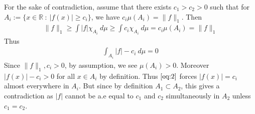\documentclass[12pt]{exam}
\theoremstyle{plain} %
\theoremstyle{definition} %
\theoremstyle{remark} %
\begin{document}
\begin{questions}
  \question
  \begin{solution}
    For the sake of contradiction, assume that there exists $c_1 >
    c_2 > 0$ such that for $A_i := \{ x \in \mathbb{R} \ :
    \ |f(x)| \ge c_i\}$,  we have $c_i\mu(A_i) = \|f\|_1$.
    Then
    \begin{align*}
      \|f\|_1 \ge \int |f|\chi_{A_i} \ d \mu \ge \int  c_i \chi_{A_i}
      \ d \mu = c_i \mu(A_i) = \| f\|_1
    \end{align*}
    Thus
    \begin{align}
      \label{eq:2}
      \int_{A_i}  |f| - c_i \ d \mu  = 0
    \end{align}
    Since $\|f\|_1, c_i > 0$, by assumption, we see $\mu(A_i) > 0$.
    Moreover $|f(x)| - c_i > 0$ for all $x \in A_i$ by definition.
    Thus $\autoref{eq:2}$ forces $|f(x)| = c_i$ almost everywhere in
    $A_i$. But since by definition $A_1 \subset A_2$, this gives a
    contradiction as $|f|$ cannot be a.e equal to $c_1$ and $c_2$
    simultaneously in $A_2$ unless $c_1 = c_2$.
  \end{solution}


\end{questions}
\end{document}
